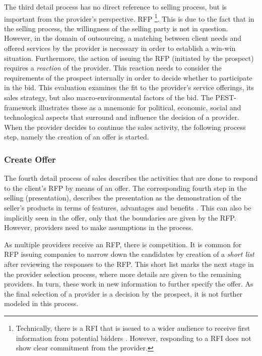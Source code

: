 	The third detail process has no direct reference to selling process, but is important  from the provider's perspective. \acrshort{RFP} \footnote{Technically, there is a \acrfull{RFI} that is issued to a wider audience to receive first  information from potential bidders \citep{bitkom2008} . However, responding to a \acrshort{RFI} does not show clear commitment from the provider.}. This is due to the fact that in the selling process, the willingness of the selling party is not in question. However, in the domain of outsourcing, a matching between client needs and offered services by the provider is necessary in order to establish a win-win situation. Furthermore, the action of issuing the \acrshort{RFP} (initiated by the prospect) requires a \textit{reaction} of the provider. This reaction needs to consider the requirements of the prospect internally in order to decide whether to participate in the bid. This evaluation examines the fit to the provider's service offerings, its sales strategy, but also macro-environmental factors of the bid. The PEST-framework \citep{0314852336} illustrates these as a mnemonic for political, economic, social and technological aspects that surround and influence the decision of a provider. 
	When the provider decides to continue the sales activity, the following process step, namely the creation of an offer is started. 
	
	\subsubsection{Create Offer}
	The fourth detail process of sales describes the activities that are done to respond  to the client's \acrshort{RFP} by means of an offer. The corresponding fourth step in the selling (presentation), describes the presentation as the demonstration of the seller's products in terms of features, advantages and benefits \citep{Moncrief_2005}. This can also be implicitly seen in the offer, only that the boundaries are given by the \acrshort{RFP}. However, providers need to make assumptions in the process. 
	
	As multiple providers receive an \acrshort{RFP}, there is competition. It is common for \acrshort{RFP} issuing companies to narrow down the candidates by creation of a \textit{short list} after reviewing the responses to the \acrshort{RFP}. This short list marks the next stage in the provider selection process, where more details are given to the remaining providers. In turn, these work in new information to further specify the offer. As the final selection of a provider is a decision by the prospect, it is not further modeled in this process. 
	
